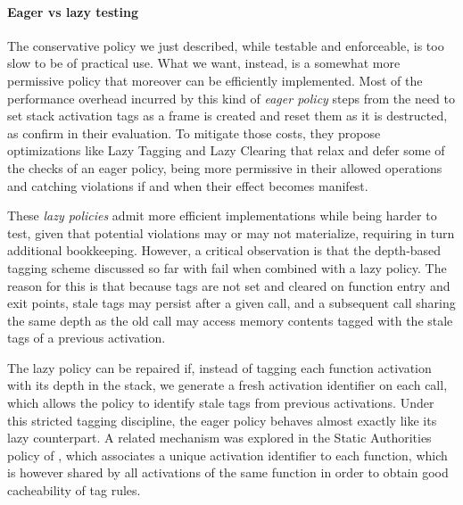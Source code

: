 \documentclass[acmsmall,review,anonymous]{acmart}\settopmatter{printfolios=true,printccs=false,printacmref=false}
\begin{document}
\paragraph*{Eager vs lazy testing}

The conservative policy we just described, while testable and enforceable, is
too slow to be of practical use. What we want, instead, is a somewhat more
permissive policy that moreover can be efficiently implemented. Most of the
performance overhead incurred by this kind of \emph{eager policy} steps from the
need to set stack activation tags as a frame is created and reset them as it is
destructed, as \citet{DBLP:conf/sp/RoesslerD18} confirm in their evaluation. To
mitigate those costs, they propose optimizations like Lazy Tagging and Lazy
Clearing that relax and defer some of the checks of an eager policy, being more
permissive in their allowed operations and catching violations if and when their
effect becomes manifest.

These \emph{lazy policies} admit more efficient implementations while being
harder to test, given that potential violations may or may not materialize,
requiring in turn additional bookkeeping. However, a critical observation is
that the depth-based tagging scheme discussed so far with fail when combined
with a lazy policy. The reason for this is that because tags are not set and
cleared on function entry and exit points, stale tags may persist after a given
call, and a subsequent call sharing the same depth as the old call may access
memory contents tagged with the stale tags of a previous activation.

The lazy policy can be repaired if, instead of tagging each function activation
with its depth in the stack, we generate a fresh activation identifier on each
call, which allows the policy to identify stale tags from previous activations.
Under this stricted tagging discipline, the eager policy behaves almost exactly
like its lazy counterpart. A related mechanism was explored in the Static
Authorities policy of \citet{DBLP:conf/sp/RoesslerD18}, which associates a
unique activation identifier to each function, which is however shared by all
activations of the same function in order to obtain good cacheability of tag
rules.


\end{document}
